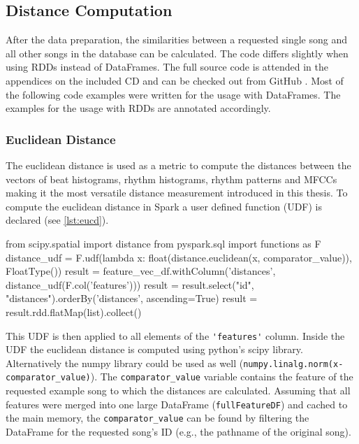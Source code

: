 \subsection{Distance Computation}

After the data preparation, the similarities between a requested single song and all other songs in the database can be calculated. The code differs slightly when using RDDs instead of DataFrames. The full source code is attended in the appendices on the included CD and can be checked out from GitHub \cite{github-code}. Most of the following code examples were written for the usage with DataFrames. The examples for the usage with RDDs are annotated accordingly.\\

\subsubsection{Euclidean Distance}

The euclidean distance is used as a metric to compute the distances between the vectors of beat histograms, rhythm histograms, rhythm patterns and MFCCs making it the most versatile distance measurement introduced in this thesis. To compute the euclidean distance in Spark a user defined function (UDF) is declared (see \ref{lst:eucd}). 

\begin{pythonCode}[frame=single,label={lst:eucd},caption={euclidean distance DF},captionpos=b]
from scipy.spatial import distance
from pyspark.sql import functions as F
distance_udf = F.udf(lambda x: float(distance.euclidean(x, comparator_value)), FloatType())
result = feature_vec_df.withColumn('distances', distance_udf(F.col('features')))
result = result.select("id", "distances").orderBy('distances', ascending=True)
result = result.rdd.flatMap(list).collect()
\end{pythonCode}

\noindent This UDF is then applied to all elements of the \lstinline{'features'} column. Inside the UDF the euclidean distance is computed using python's scipy library. Alternatively the numpy library could be used as well (\lstinline{numpy.linalg.norm(x-comparator_value)}). The \lstinline{comparator_value} variable contains the feature of the requested example song to which the distances are calculated. Assuming that all features were merged into one large DataFrame (\lstinline{fullFeatureDF}) and cached to the main memory, the \lstinline{comparator_value} can be found by filtering the DataFrame for the requested song's ID (e.g., the pathname of the original song).

